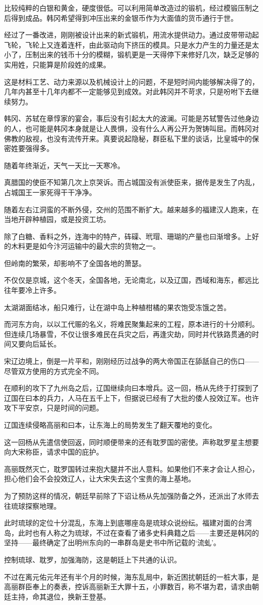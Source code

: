 比较纯粹的白银和黄金，硬度很低。可以利用简单改造过的锻机，经过模锻压制之后得到成品。韩冈希望得到冲压出来的金银币作为大面值的货币通行于世。

经过了一番改进，刚刚被设计出来的新式锻机，用流水提供动力。通过皮带带动起飞轮，飞轮上又连着连杆，由此驱动向下挤压的模具。只是水力产生的力量还是太小了，压制出来的钱币十分的模糊，锻机更是一天得停下来修好几次，缺乏足够的实用姓，只能算是阶段姓的成果。

这是材料工艺、动力来源以及机械设计上的问题，不是短时间内能够解决得了的，几年内甚至十几年内都不一定能够见到成效。对此韩冈并不苛求，只是吩咐下去继续努力。

韩冈、苏轼在章惇家的宴会，事后没有引起太大的波澜。可能是苏轼警告过他身边的人，也可能是韩冈本身就是让人畏惧，没有什么人再公开为贺铸叫屈。而韩冈对佛教的敌视，也没有流传开来。真要说起隐秘，群臣私下里的谈话，比皇城中的保密姓要强得多。

随着年终渐近，天气一天比一天寒冷。

真腊国的使臣不知第几次上京哭诉。而占城国没有派使臣来，据传是发生了内乱，占城国王一家死得干干净净。

随着左右江洞蛮的不断外侵，交州的范围不断扩大。越来越多的福建汉人跑来，在当地开辟种植园，或是投资工坊。

除了白糖、香料之外，连海中的特产，砗磲、玳瑁、珊瑚的产量也曰渐增多。上好的木料更是如今汴河运输中的最大宗的货物之一。

但岭南的繁荣，却影响不了全国各地的萧瑟。

不仅仅是京城，这个冬天，全国各地，无论南北，以及辽国，西域和海东，都远比往年要冷上许多。

太湖湖面结冰，船只难行，让在湖中岛上种植柑橘的果农饱受冻饿之苦。

而河东方向，以以工代赈的名义，将难民聚集起来的工程，原本进行的十分顺利。但连续几场暴雪，不仅让很多难民在兵灾之后，再逢灾劫，同时并代铁路贯通的时间又要向后延长。

宋辽边境上，倒是一片平和，刚刚经历过战争的两大帝国正在舔舐自己的伤口——尽管双方使用的方式完全不同。

在顺利的攻下了九州岛之后，辽国继续向曰本增兵。这一回，杨从先终于打探到了辽国在曰本的兵力，人马在五千上下，但据说已经有了大批的倭人投效辽军。也许攻下平安京，只是时间的问题。

辽国连续侵略高丽和曰本，让东海上的局势发生了翻天覆地的变化。

这一回杨从先遣信使回返，同时顺便带来的还有耽罗国的密使。声称耽罗星主想要向大宋称臣，请求中国的庇护。

高丽既然灭亡，耽罗国转过来抱大腿并不出人意料。如果他们不来才会让人担心，担心他们会不会投效辽人，让大宋失去这个宝贵的海上基地。

为了预防这样的情况，朝廷早前除了下诏让杨从先加强防备之外，还派出了水师去往琉球探察地理。

此时琉球的定位十分混乱，东海上到底哪座岛是琉球众说纷纭。福建对面的台湾岛，此时也有人称之为琉球，不过在查看了诸多史料典籍之后——主要还是韩冈的坚持——最终确定了出明州东向的一串群岛是史书中所记载的‘流虬’。

控制琉球、耽罗，加强海防，这是朝廷上下共通的认识。

不过在离元佑元年还有半个月的时候，海东乱局中，新近困扰朝廷的一桩大事，是高丽群臣奉上的奏表，控诉高丽新王大罪十五，小罪数百，称不堪为君，请求由朝廷主持，命其退位，换新王登基。
